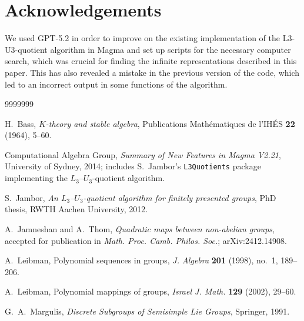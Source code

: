 \documentclass[11pt, a4paper]{amsproc}
\theoremstyle{remark}
\theoremstyle{plain}
\begin{document}
\section*{Acknowledgements}

We used GPT-5.2 in order to improve on the existing implementation of the L3-U3-quotient algorithm in Magma and set up scripts for the necessary computer search, which was crucial for finding the infinite representations described in this paper. This has also revealed a mistake in the previous version of the code, which led to an incorrect output in some functions of the algorithm.

\begin{thebibliography}{9999999}

H.~Bass,
\emph{$K$-theory and stable algebra},
Publications Math\'ematiques de l'IH\'ES \textbf{22} (1964), 5--60.

Computational Algebra Group,
\emph{Summary of New Features in Magma V2.21},
University of Sydney, 2014;
includes S.~Jambor’s \texttt{L3Quotients} package implementing the $L_3$--$U_3$-quotient algorithm.

S.~Jambor,
\emph{An $L_3$--$U_3$-quotient algorithm for finitely presented groups},
PhD thesis, RWTH Aachen University, 2012.

A.~Jamneshan and A.~Thom,
\emph{Quadratic maps between non-abelian groups},
accepted for publication in \emph{Math. Proc. Camb. Philos. Soc.};
arXiv:2412.14908.

A.~Leibman,
\newblock Polynomial sequences in groups,
\newblock \emph{J. Algebra} \textbf{201} (1998), no.~1, 189--206.

A.~Leibman,
\newblock Polynomial mappings of groups,
\newblock \emph{Israel J. Math.} \textbf{129} (2002), 29--60.

G.~A.~Margulis,
\emph{Discrete Subgroups of Semisimple Lie Groups},
Springer, 1991.

\end{thebibliography}
\end{document}
